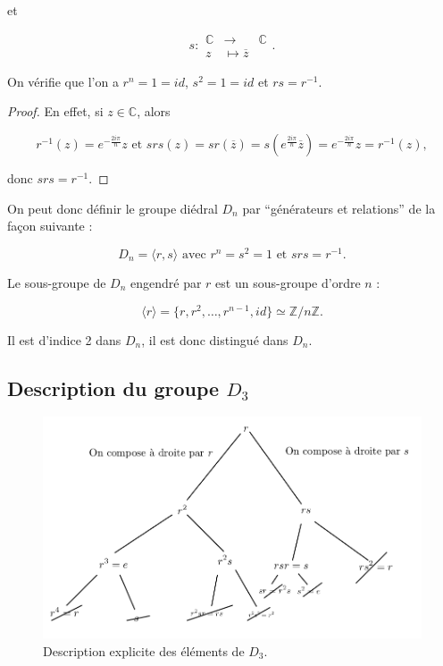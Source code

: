 \documentclass[french]{book}
\begin{document}
et

\[
s:
  \begin{array}{rcl}
  \mathbb{C} & \longrightarrow & \mathbb{C} \\
  z & \longmapsto \overline{z}
  \end{array}.
\]


On vérifie que l'on a $r ^{n} = 1 = id$, $s ^2 = 1 =id$ et $rs = r ^{-1} $.

\begin{proof}
  En effet, si $z \in \mathbb{C}$, alors

  \[
  r ^{-1} (z) = e^{- \frac{2 i \pi}{n}} z \text{ et } s r s(z) = s r (\overline{z} ) = s \left( e^{\frac{2 i \pi}{n}} \overline{z} \right) = e^{- \frac{2 i \pi}{n}} z = r ^{-1} (z),
  \]

  donc $s r s = r ^{-1} $.
\end{proof}

On peut donc définir le groupe diédral $D_n$ par ``générateurs et relations'' de la façon suivante :

\[
D_n = \langle r,s \rangle  \text{ avec } r ^{n} = s ^2 = 1 \text{ et } s r s = r ^{-1} .
\]

Le sous-groupe de $D_n$ engendré par $r$ est un sous-groupe d'ordre $n$ :

\[
\langle r \rangle = \{ r, r ^2, \dots, r ^{n-1}, id \} \simeq \mathbb{Z}/{ n }\mathbb{Z} .
\]

Il est d'indice 2 dans $D_n$, il est donc distingué dans $D_n$.

\subsection{Description du groupe $D_3$}

\begin{figure}[h!]
  \centering
  \includegraphics[scale=0.3]{figures/elts-d3.png}
  \caption{Description explicite des éléments de $D_3$.}
  \label{}
\end{figure}
\end{document}
